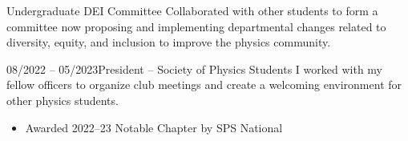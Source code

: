 \documentclass{cv}
\begin{document}

\begin{extracurricular}{}{Undergraduate DEI Committee}
    Collaborated with other students to form a committee now proposing and
    implementing departmental changes related to diversity, equity, and
    inclusion to improve the physics community.
\end{extracurricular}

\begin{extracurricular}{08/2022 -- 05/2023}{President -- Society of Physics Students}
    I worked with my fellow officers to organize club meetings and create a
    welcoming environment for other physics students.
    \vspace{-0.03in}
    \begin{itemize}[leftmargin=15pt]
        \item Awarded 2022--23 Notable Chapter by SPS National
    \end{itemize}
\end{extracurricular}
\end{document}
